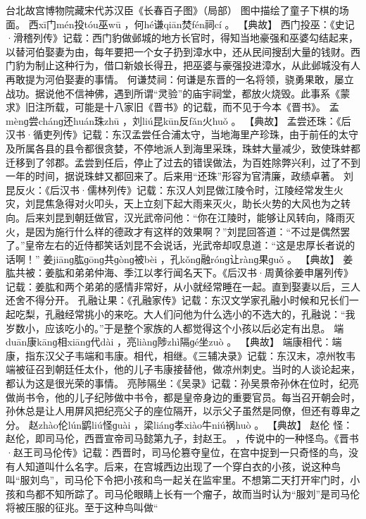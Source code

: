 \documentclass[12pt,UTF8]{ctexbook}
\begin{document}
台北故宫博物院藏宋代苏汉臣《长春百子图》（局部）
图中描绘了童子下棋的场面。
西xī门mén投tóu巫wū
，何hé谦qiān焚fén祠cí
。
【典故】
西门投巫：《史记·滑稽列传》记载：西门豹做邺城的地方长官时，得知当地豪强和巫婆勾结起来，以替河伯娶妻为由，每年要把一个女子扔到漳水中，还从民间搜刮大量的钱财。西门豹为制止这种行为，借口新娘长得丑，把巫婆与豪强投进漳水，从此邺城没有人再敢提为河伯娶妻的事情。
何谦焚祠：何谦是东晋的一名将领，骁勇果敢，屡立战功。据说他不信神佛，遇到所谓“灵验”的庙宇祠堂，都放火烧毁。此事系《蒙求》旧注所载，可能是十八家旧《晋书》的记载，而不见于今本《晋书》。
孟mènɡ尝chánɡ还huán珠zhū
，刘liú昆kūn反fǎn火huǒ
。
【典故】
孟尝还珠：《后汉书·循吏列传》记载：东汉孟尝任合浦太守，当地海里产珍珠，由于前任的太守及所属各县的县令都很贪婪，不停地派人到海里采珠，珠蚌大量减少，致使珠蚌都迁移到了邻郡。孟尝到任后，停止了过去的错误做法，为百姓除弊兴利，过了不到一年的时间，据说珠蚌又都回来了。后来用“还珠”形容为官清廉，政绩卓著。
刘昆反火：《后汉书·儒林列传》记载：东汉人刘昆做江陵令时，江陵经常发生火灾，刘昆焦急得对火叩头，天上立刻下起大雨来灭火，助长火势的大风也为之转向。后来刘昆到朝廷做官，汉光武帝问他：“你在江陵时，能够让风转向，降雨灭火，是因为施行什么样的德政才有这样的效果啊？”刘昆回答道：“不过是偶然罢了。”皇帝左右的近侍都笑话刘昆不会说话，光武帝却叹息道：“这是忠厚长者说的话啊！”
姜jiānɡ肱ɡōnɡ共ɡònɡ被bèi
，孔kǒnɡ融rónɡ让rànɡ果ɡuǒ
。
【典故】
姜肱共被：姜肱和弟弟仲海、季江以孝行闻名天下。《后汉书·周黄徐姜申屠列传》记载：姜肱和两个弟弟的感情非常好，从小就经常睡在一起。直到娶妻以后，三人还舍不得分开。
孔融让果：《孔融家传》记载：东汉文学家孔融小时候和兄长们一起吃梨，孔融经常挑小的来吃。大人们问他为什么选小的不选大的，孔融说：“我岁数小，应该吃小的。”于是整个家族的人都觉得这个小孩以后必定有出息。
端duān康kānɡ相xiānɡ代dài
，亮liànɡ陟zhì隔ɡé坐zuò
。
【典故】
端康相代：端康，指东汉父子韦端和韦康。相代，相继。《三辅决录》记载：东汉末，凉州牧韦端被征召到朝廷任太仆，他的儿子韦康接替他，做凉州刺史。当时的人谈论起来，都认为这是很光荣的事情。
亮陟隔坐：《吴录》记载：孙吴景帝孙休在位时，纪亮做尚书令，他的儿子纪陟做中书令，都是皇帝身边的重要官员。每当召开朝会时，孙休总是让人用屏风把纪亮父子的座位隔开，以示父子虽然是同僚，但还有尊卑之分。
赵zhào伦lún鹠liú怪ɡuài
，梁liánɡ孝xiào牛niú祸huò
。
【典故】
赵伦
怪：赵伦，即司马伦，西晋宣帝司马懿第九子，封赵王。
 ，传说中的一种怪鸟。《晋书·赵王司马伦传》记载：西晋时，司马伦篡夺皇位，在宫中捉到一只奇怪的鸟，没有人知道叫什么名字。后来，在宫城西边出现了一个穿白衣的小孩，说这种鸟叫“服刘鸟”，司马伦下令把小孩和鸟一起关在监牢里。不想第二天打开牢门时，小孩和鸟都不知所踪了。司马伦眼睛上长有一个瘤子，故而当时认为“服刘”是司马伦将被压服的征兆。至于这种鸟叫做“
\end{document}
